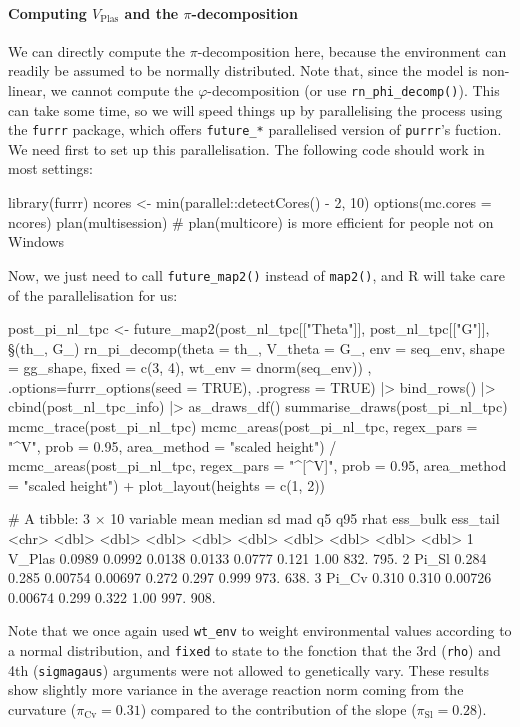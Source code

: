 \documentclass[a4paper,12pt,twoside]{article}
\begin{document}
\paragraph{Computing $V_{\text{Plas}}$ and the $\pi$-decomposition}
We can directly compute the $\pi$-decomposition here, because the environment can readily be assumed to be normally distributed. Note that, since the model is non-linear, we cannot compute the $\varphi$-decomposition (or use \texttt{rn\_phi\_decomp()}).
This can take some time, so we will speed things up by parallelising the process using the \texttt{furrr} package, which offers \texttt{future\_*} parallelised version of \texttt{purrr}'s fuction.
We need first to set up this parallelisation. The following code should work in most settings:
\begin{Rinput}
library(furrr)
ncores <- min(parallel::detectCores() - 2, 10)
options(mc.cores = ncores)
plan(multisession)  # plan(multicore) is more efficient for people not on Windows
\end{Rinput}
Now, we just need to call \texttt{future\_map2()} instead of \texttt{map2()}, and R will take care of the parallelisation for us:
\begin{Rinput}
post_pi_nl_tpc <-
    future_map2(post_nl_tpc[["Theta"]], post_nl_tpc[["G"]],
                \§§(th_, G_) { rn_pi_decomp(theta    = th_,
                                          V_theta  = G_,
                                          env      = seq_env,
                                          shape    = gg_shape,
                                          fixed    = c(3, 4),
                                          wt_env   = dnorm(seq_env)) },
                .options=furrr_options(seed = TRUE),
                .progress = TRUE) |>
    bind_rows() |>
    cbind(post_nl_tpc_info) |>
    as_draws_df()
summarise_draws(post_pi_nl_tpc)
mcmc_trace(post_pi_nl_tpc)
mcmc_areas(post_pi_nl_tpc,
           regex_pars = "^V",
           prob = 0.95,
           area_method = "scaled height") /
    mcmc_areas(post_pi_nl_tpc,
               regex_pars = "^[^V]",
               prob = 0.95,
               area_method = "scaled height") +
    plot_layout(heights = c(1, 2))
\end{Rinput}
\begin{Routput}
# A tibble: 3 × 10
  variable   mean median      sd     mad     q5   q95  rhat ess_bulk ess_tail
  <chr>     <dbl>  <dbl>   <dbl>   <dbl>  <dbl> <dbl> <dbl>    <dbl>    <dbl>
1 V_Plas   0.0989 0.0992 0.0138  0.0133  0.0777 0.121 1.00      832.     795.
2 Pi_Sl    0.284  0.285  0.00754 0.00697 0.272  0.297 0.999     973.     638.
3 Pi_Cv    0.310  0.310  0.00726 0.00674 0.299  0.322 1.00      997.     908.
\end{Routput}
Note that we once again used \texttt{wt\_env} to weight environmental values according to a normal distribution, and \texttt{fixed} to state to the fonction that the 3rd (\texttt{rho}) and 4th (\texttt{sigmagaus}) arguments were not allowed to genetically vary.
These results show slightly more variance in the average reaction norm coming from the curvature ($\pi_{\text{Cv}}=0.31$) compared to the contribution of the slope ($\pi_{\text{Sl}}=0.28$).
\end{document}
